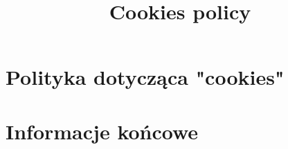 \documentclass[10pt,a4paper]{article}
\title{Cookies policy} %
\author{}
\date{}
\begin{document}
	
\section{Polityka dotycząca "cookies"}
	


		
\section{Informacje końcowe}
	
\end{document}
